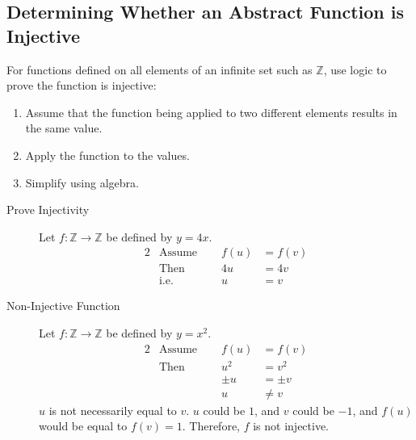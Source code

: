 \documentclass[\main/notes.tex]{subfiles}
\begin{document}
			\subsection{Determining Whether an Abstract Function is Injective}
				For functions defined on all elements of an infinite set such as $\mathbb{Z}$, use logic to prove the function is injective:
				\nopagebreak
				\begin{enumerate}[nosep]
					\item Assume that the function being applied to two different elements results in the same value.
					\item Apply the function to the values.
					\item Simplify using algebra.
				\end{enumerate}
				\nopagebreak
				\begin{example}
					\begin{description}
						\item[Prove Injectivity] Let $f: \mathbb{Z} \rightarrow \mathbb{Z}$ be defined by $y = 4x$.
							\begin{alignat*}{2}
								& \text{Assume } \quad &f(u) &= f(v)\tag*{$(1)$}\\
								& \text{Then } &4u &= 4v\tag*{$(2)$}\\
								& \text{i.e. } &u &= v\tag*{$(3)$}
							\end{alignat*}
						\item[Non-Injective Function]  Let $f: \mathbb{Z} \rightarrow \mathbb{Z}$ be defined by $y = x^{2}$.
							\begin{alignat*}{2}
								& \text{Assume } \quad &f(u) &= f(v)\\
								& \text{Then } &u^{2} &= v^{2}\\
								& & \pm{u} &= \pm{v}\\
								& & u &\neq v
							\end{alignat*}
							$u$ is not necessarily equal to $v$. $u$ could be $1$, and $v$ could be $-1$, and $f(u)$ would be equal to $f(v) = 1$. Therefore, $f$ is not injective.
					\end{description}
				\end{example}
\end{document}
